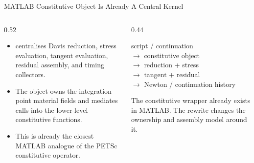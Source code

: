 \documentclass[aspectratio=169,10pt]{beamer}
\begin{document}
\begin{frame}{MATLAB Constitutive Object Is Already A Central Kernel}
\small
\begin{columns}[T,totalwidth=\textwidth]
\begin{column}{0.52\textwidth}
\begin{softbox}
\begin{itemize}
  \item {} centralises Davis reduction, stress evaluation, tangent evaluation, residual assembly, and timing collectors.
  \item The object owns the integration-point material fields and mediates calls into the lower-level constitutive functions.
  \item This is already the closest MATLAB analogue of the PETSc constitutive operator.
\end{itemize}
\end{softbox}
\end{column}
\begin{column}{0.44\textwidth}
\begin{pseudobox}
script / continuation\\
$\rightarrow$ constitutive object\\
$\rightarrow$ reduction + stress\\
$\rightarrow$ tangent + residual\\
$\rightarrow$ Newton / continuation history
\end{pseudobox}
\vspace{0.16cm}
\begin{callout}
The constitutive wrapper already exists in MATLAB. The rewrite changes the ownership and assembly model around it.
\end{callout}
\end{column}
\end{columns}
\end{frame}
\end{document}
